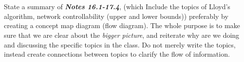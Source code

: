 \documentclass[]{article}
\numberwithin{equation}{section}
\newtheorem{definition}{Definition}
\begin{document}








\newpage
\section{}
State a summary of \emph{\textbf{Notes 16.1-17.4}}, (which Include the topics of Lloyd's algorithm, network controllability (upper and lower bounds)) preferably by creating a concept map diagram (flow diagram). 
The whole purpose is to make sure that we are clear about the \emph{bigger picture}, and reiterate why are we doing and discussing the specific topics in the class. 
Do not merely write the topics, instead create connections between topics to clarify the flow of information.
\end{document}
